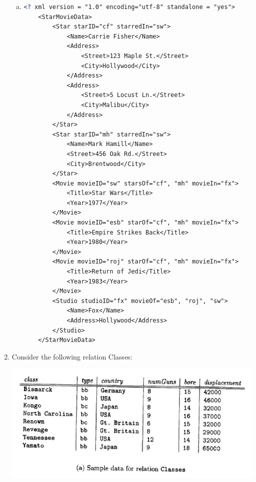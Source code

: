 \documentclass[12pt]{article}
\begin{document}
\begin{enumerate}[1.]
\begin{enumerate}[a)]
        \item

    \begin{lstlisting}[language=XML]
    <? xml version = "1.0" encoding="utf-8" standalone = "yes">
    <StarMovieData>
        <Star starID="cf" starredIn="sw">
            <Name>Carrie Fisher</Name>
            <Address>
                <Street>123 Maple St.</Street>
                <City>Hollywood</City>
            </Address>
            <Address>
                <Street>5 Locust Ln.</Street>
                <City>Malibu</City>
            </Address>
        </Star>
        <Star starID="mh" starredIn="sw">
            <Name>Mark Hamill</Name>
            <Street>456 Oak Rd.</Street>
            <City>Brentwood</City>
        </Star>
        <Movie movieID="sw" starsOf="cf", "mh" movieIn="fx">
            <Title>Star Wars</Title>
            <Year>1977</Year>
        </Movie>
        <Movie movieID="esb" starOf="cf", "mh" movieIn="fx">
            <Title>Empire Strikes Back</Title>
            <Year>1980</Year>
        </Movie>
        <Movie movieID="roj" starOf="cf", "mh" movieIn="fx">
            <Title>Return of Jedi</Title>
            <Year>1983</Year>
        </Movie>
        <Studio studioID="fx" movieOf="esb", "roj", "sw">
            <Name>Fox</Name>
            <Address>Hollywood</Address>
        </Studio>
    </StarMovieData>
    \end{lstlisting}

    \end{enumerate}

    \item

    Consider the following relation Classes:

    \begin{center}
    \includegraphics[width=\linewidth]{images/worksheet_9_solution_9.png}
    \end{center}


\end{enumerate}
\end{document}
